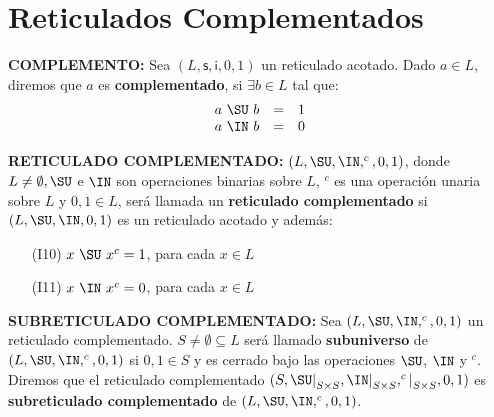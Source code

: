\section{Reticulados Complementados}

  \PN \textbf{COMPLEMENTO:} Sea $(L,\mathsf{s},\mathsf{i},0,1)$ un reticulado acotado. Dado $a \in L$, diremos que
  $a$ es \textbf{complementado}, si $\exists b \in L$ tal que:
  \[
    \begin{array}{rcl}
      a \ \SU \ b &=& 1 \\
      a \ \IN \ b &=& 0
    \end{array}
  \]

  \PN \textbf{RETICULADO COMPLEMENTADO:} $(L, \SU, \IN, ^{c}, 0, 1)$, donde $L \neq \emptyset, \SU$ e $\IN$ son
  operaciones binarias sobre $L$, $^{c}$ es una operación unaria sobre $L$ y $0, 1 \in L$, será llamada un
  \textbf{reticulado complementado} si $(L, \SU, \IN, 0, 1)$ es un reticulado acotado y además:
  \begin{enumerate}
    \item[(I10)] $x \ \SU \ x^{c} = 1$, para cada $x \in L$
    \item[(I11)] $x \ \IN \ x^{c} = 0$, para cada $x \in L$
  \end{enumerate}

  \vspace{3mm}
  \PN \textbf{SUBRETICULADO COMPLEMENTADO:} Sea $(L, \SU, \IN, ^{c}, 0, 1)$ un reticulado complementado. $S \neq
  \emptyset \subseteq L$ será llamado \textbf{subuniverso} de $(L, \SU, \IN, ^{c}, 0, 1)$ si $0, 1 \in S$ y es cerrado
  bajo las operaciones $\SU$, $\IN$ y $^{c}$. Diremos que el reticulado complementado
  $(S, \SU\mathrm{\mid}_{S \times S}, \IN\mathrm{\mid}_{S \times S}, ^{c}\mathrm{\mid}_{S \times S}, 0, 1)$ es
  \textbf{subreticulado complementado} de $(L, \SU, \IN, ^{c}, 0, 1)$.

